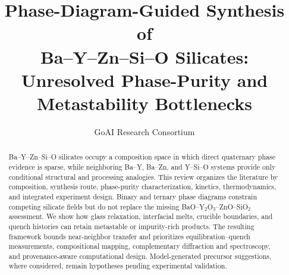 \documentclass[11pt]{article}
\title{Phase-Diagram-Guided Synthesis of \\
Ba--Y--Zn--Si--O Silicates: \\
Unresolved Phase-Purity and Metastability Bottlenecks}
\author{GoAI Research Consortium}
\date{}
\begin{document}
\maketitle

\begin{abstract}
Ba--Y--Zn--Si--O silicates occupy a composition space in which direct quaternary phase evidence is sparse, while neighboring Ba--Y, Ba--Zn, and Y--Si--O systems provide only conditional structural and processing analogies. This review organizes the literature by composition, synthesis route, phase-purity characterization, kinetics, thermodynamics, and integrated experiment design. Binary and ternary phase diagrams constrain competing silicate fields but do not replace the missing BaO--Y$_2$O$_3$--ZnO--SiO$_2$ assessment. We show how glass relaxation, interfacial melts, crucible boundaries, and quench histories can retain metastable or impurity-rich products. The resulting framework bounds near-neighbor transfer and prioritizes equilibration--quench measurements, compositional mapping, complementary diffraction and spectroscopy, and provenance-aware computational design. Model-generated precursor suggestions, where considered, remain hypotheses pending experimental validation.
\end{abstract}
\end{document}
